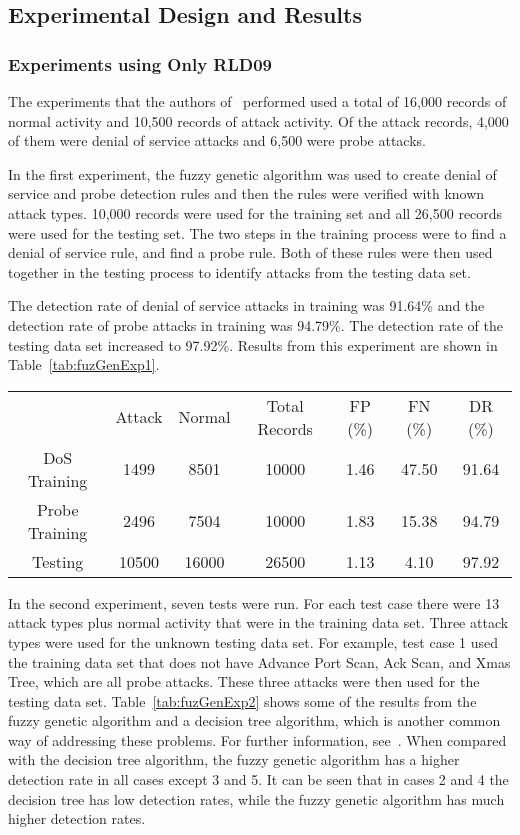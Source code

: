 \documentclass{sig-alternate}
\begin{document}
\subsection{Experimental Design and Results}

\subsubsection{Experiments using Only RLD09}
The experiments that the authors of~\cite{6496342, 6559603} performed used a total of 16,000 records of normal activity and 10,500 records of attack activity. Of the attack records, 4,000 of them were denial of service attacks and 6,500 were probe attacks.

In the first experiment, the fuzzy genetic algorithm was used to create denial of service and probe detection rules and then the rules were verified with known attack types. 10,000 records were used for the training set and all 26,500 records were used for the testing set. The two steps in the training process were to find a denial of service rule, and find a probe rule. Both of these rules were then used together in the testing process to identify attacks from the testing data set.

The detection rate of denial of service attacks in training was 91.64\% and the detection rate of probe attacks in training was 94.79\%. The detection rate of the testing data set increased to 97.92\%. Results from this experiment are shown in Table~\ref{tab:fuzGenExp1}.

\begin{table*}
\center
\caption{Results from Experiment 1}
\begin{tabular}{ccccccc}
 & Attack & Normal & Total Records & FP (\%) & FN (\%) & DR (\%)\\
DoS Training & 1499 & 8501 & 10000 & 1.46 & 47.50 & 91.64\\
Probe Training & 2496 & 7504 & 10000 & 1.83 & 15.38 & 94.79\\
Testing & 10500 & 16000 & 26500 & 1.13 & 4.10 & 97.92\\
\end{tabular}
\label{tab:fuzGenExp1}
\center
\end{table*}

In the second experiment, seven tests were run. For each test case there were 13 attack types plus normal activity that were in the training data set. Three attack types were used for the unknown testing data set. For example, test case 1 used the training data set that does not have Advance Port Scan, Ack Scan, and Xmas Tree, which are all probe attacks. These three attacks were then used for the testing data set. Table~\ref{tab:fuzGenExp2} shows some of the results from the fuzzy genetic algorithm and a decision tree algorithm, which is another common way of addressing these problems. For further information, see~\cite{decisionTree}. When compared with the decision tree algorithm, the fuzzy genetic algorithm has a higher detection rate in all cases except 3 and 5. It can be seen that in cases 2 and 4 the decision tree has low detection rates, while the fuzzy genetic algorithm has much higher detection rates.
\end{document}
